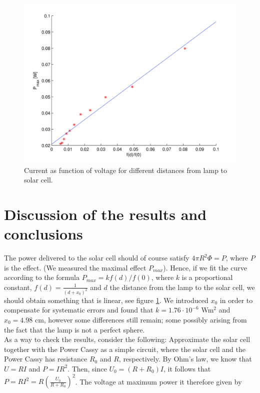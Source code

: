\documentclass[12pt,a4paper]{article}
\begin{document}
\begin{figure}[!h]
  \begin{center}
    \includegraphics[scale=0.2]{pmaxvsf.png}
  \end{center}
  \caption{Current as function of voltage for different distances from lamp to solar cell.}
  \label{pmaxvsf}
\end{figure}
\vfill
\clearpage

\section{Discussion of the results and conclusions}

The power delivered to the solar cell should of course satisfy $4\pi R^2\Phi = P$, where $P$ is the effect. (We measured the maximal effect $P_{max}$). Hence, if we fit the curve according to the formula $P_{max}=kf(d)/f(0)$, where $k$ is a proportional constant, $f(d)=\frac{1}{(d+x_0)^2}$ and $d$ the distance from the lamp to the solar cell, we should obtain something that is linear, see figure \ref{pmaxvsf}. We introduced $x_0$ in order to compensate for systematic errors and found that $k=1.76\cdot 10^{-6}$ Wm${}^2$ and $x_0=4.98$ cm, however some differences still remain; some possibly arising from the fact that the lamp is not a perfect sphere. \\

As a way to check the results, consider the following: Approximate the solar cell together with the Power Cassy as a simple circuit, where the solar cell and the Power Cassy has resistance $R_0$ and $R$, respectively. 
By Ohm's law, we know that $U=RI$ and $P=IR^2$. Then, since $U_0=(R+R_0)I$, it follows that $P=RI^2=R\left( \frac{U_0}{R+R_0} \right)^2$.
The voltage at maximum power it therefore given by
\end{document}
